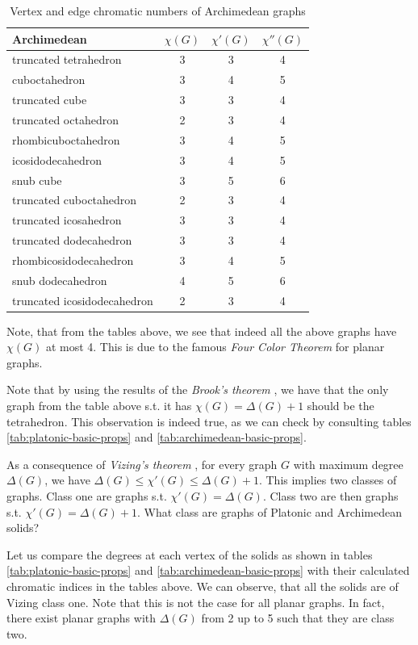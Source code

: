\begin{table}[H]
\centering
\begin{tabular}{l@{\hspace{1.5cm}}ccc}
\toprule
\textbf{Archimedean} & \textbf{$\chi(G)$} & \textbf{$\chi'(G)$} & \textbf{$\chi''(G)$} \\
\midrule
truncated tetrahedron & 3 & 3 & 4 \\
cuboctahedron & 3 & 4 & 5 \\
truncated cube & 3 & 3 & 4 \\
truncated octahedron & 2 & 3 & 4 \\
rhombicuboctahedron & 3 & 4 & 5 \\
icosidodecahedron & 3 & 4 & 5 \\
snub cube & 3 & 5 & 6 \\
truncated cuboctahedron & 2 & 3 & 4 \\
truncated icosahedron & 3 & 3 & 4 \\
truncated dodecahedron & 3 & 3 & 4 \\
rhombicosidodecahedron & 3 & 4 & 5 \\
snub dodecahedron & 4 & 5 & 6 \\
truncated icosidodecahedron & 2 & 3 & 4 \\
\bottomrule
\end{tabular}
\caption{Vertex and edge chromatic numbers of Archimedean graphs}
\label{tab:archimedean-chrom-nums}
\end{table}

Note, that from the tables above, we see that indeed all the above graphs have $\chi(G)$ at most 4. This is due to the famous \textit{Four Color Theorem} \cite{appelhaken76} for planar graphs.

Note that by using the results of the \textit{Brook's theorem} \cite{brooks41}, we have that the only graph from the table above s.t. it has $\chi(G) = \Delta(G) + 1$ should be the tetrahedron. This observation is indeed true, as we can check by consulting tables \ref{tab:platonic-basic-props} and \ref{tab:archimedean-basic-props}. 

As a consequence of \textit{Vizing's theorem} \cite{misra92}, for every graph $G$ with maximum degree $\Delta(G)$, we have $\Delta(G) \leq \chi'(G) \leq \Delta(G) + 1$. This implies two classes of graphs. Class one are graphs s.t. $\chi'(G) = \Delta(G)$. Class two are then graphs s.t. $\chi'(G) = \Delta(G) + 1$. What class are graphs of Platonic and Archimedean solids?

Let us compare the degrees at each vertex of the solids as shown in tables \ref{tab:platonic-basic-props} and \ref{tab:archimedean-basic-props} with their calculated chromatic indices in the tables above. We can observe, that all the solids are of Vizing class one. Note that this is not the case for all planar graphs. In fact, there exist planar graphs with $\Delta(G)$ from 2 up to 5 such that they are class two.

